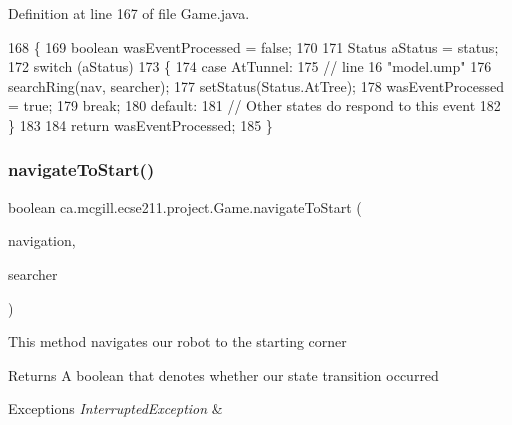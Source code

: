 Definition at line 167 of file Game.\+java.


\begin{DoxyCode}
168   \{
169     \textcolor{keywordtype}{boolean} wasEventProcessed = \textcolor{keyword}{false};
170     
171     Status aStatus = status;
172     \textcolor{keywordflow}{switch} (aStatus)
173     \{
174       \textcolor{keywordflow}{case} AtTunnel:
175         \textcolor{comment}{// line 16 "model.ump"}
176         searchRing(nav, searcher);
177         setStatus(Status.AtTree);
178         wasEventProcessed = \textcolor{keyword}{true};
179         \textcolor{keywordflow}{break};
180       \textcolor{keywordflow}{default}:
181         \textcolor{comment}{// Other states do respond to this event}
182     \}
183 
184     \textcolor{keywordflow}{return} wasEventProcessed;
185   \}
\end{DoxyCode}
\mbox{\label{enumca_1_1mcgill_1_1ecse211_1_1project_1_1_game_aa9d873f6cd4ef177c1622c24f72b0e0a}} 
\subsubsection{\texorpdfstring{navigate\+To\+Start()}{navigateToStart()}}
{\footnotesize\ttfamily boolean ca.\+mcgill.\+ecse211.\+project.\+Game.\+navigate\+To\+Start (\begin{DoxyParamCaption}\item[{\hyperlink{classca_1_1mcgill_1_1ecse211_1_1project_1_1_navigation}{Navigation}}]{navigation,  }\item[{\hyperlink{classca_1_1mcgill_1_1ecse211_1_1project_1_1_ring_searcher}{Ring\+Searcher}}]{searcher }\end{DoxyParamCaption})}

This method navigates our robot to the starting corner

\begin{DoxyReturn}{Returns}
A boolean that denotes whether our state transition occurred 
\end{DoxyReturn}

\begin{DoxyExceptions}{Exceptions}
{\em Interrupted\+Exception} & \\
\hline
\end{DoxyExceptions}


